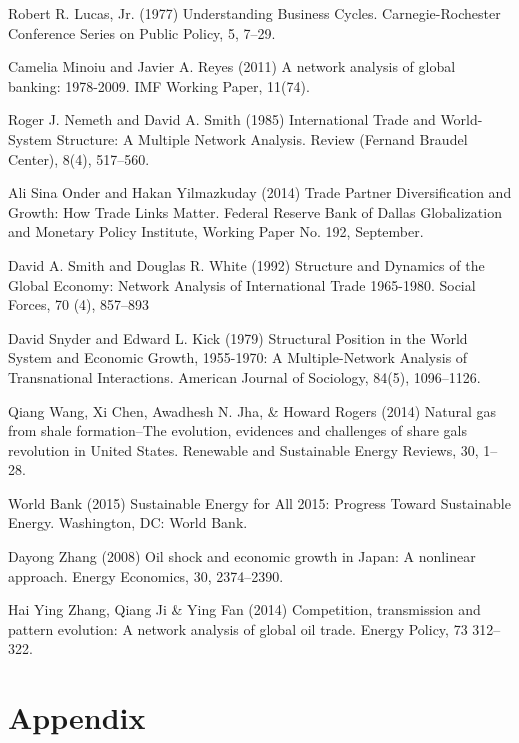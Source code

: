 \documentclass[10pt,letterpaper,pdftex]{article}
\begin{document}
\begin{thebibliography}{99}
Robert R. Lucas, Jr. (1977) Understanding Business Cycles. Carnegie-Rochester Conference Series on Public Policy, 5, 7--29. 

Camelia Minoiu and Javier A. Reyes (2011) A network analysis of global banking: 1978-2009. IMF Working Paper, 11(74).

Roger J. Nemeth and David A. Smith (1985) International Trade and World-System Structure: A Multiple Network Analysis. Review (Fernand Braudel Center), 8(4), 517--560.

Ali Sina Onder and Hakan Yilmazkuday (2014) Trade Partner Diversification and Growth: How Trade Links Matter. Federal Reserve Bank of Dallas Globalization and Monetary Policy Institute, Working Paper No. 192, September. 

David A. Smith and Douglas R. White (1992) Structure and Dynamics of the Global Economy: Network Analysis of International Trade 1965-1980. Social Forces, 70 (4), 857--893

David Snyder and Edward L. Kick (1979) Structural Position in the World System and Economic Growth, 1955-1970: A Multiple-Network Analysis of Transnational Interactions. American Journal of Sociology, 84(5), 1096--1126.

Qiang Wang, Xi Chen, Awadhesh N. Jha, \& Howard Rogers (2014) Natural gas from shale formation--The evolution, evidences and challenges of share gals revolution in United States. Renewable and Sustainable Energy Reviews, 30, 1--28.

World Bank (2015) Sustainable Energy for All 2015: Progress Toward Sustainable Energy. Washington, DC: World Bank.

Dayong Zhang (2008) Oil shock and economic growth in Japan: A nonlinear approach. Energy Economics, 30, 2374--2390.

Hai Ying Zhang, Qiang Ji \& Ying Fan (2014) Competition, transmission and pattern evolution: A network analysis of global oil trade. Energy Policy, 73 312--322.

\end{thebibliography} 


\newpage 
\setcounter{secnumdepth}{0}
\section{Appendix} \thispagestyle{emptyheader} \label{appendix}
\end{document}

